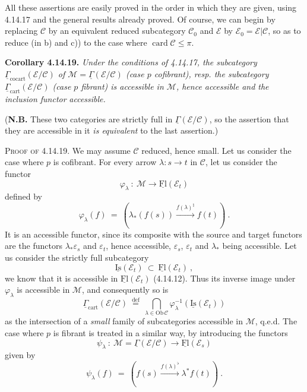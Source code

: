 \documentclass[11pt]{article}
\newcommand{\printedpage}[1]{\marginpar{\footnotesize p.~#1}}
\newcommand{\msp}[1]{\marginpar{\footnotesize [#1]}}
\newcommand{\uGamma}{\underline{\Gamma}}
\newcommand{\uFl}{\underline{\mathrm{Fl}}}
\newcommand{\uIs}{\underline{\mathrm{Is}}}
\newcommand{\Ob}{\mathrm{Ob}\,}
\newcommand{\Fl}{\mathrm{Fl}\,}
\newcommand{\cocart}{\mathrm{cocart}}
\newcommand{\cart}{\mathrm{cart}}
\begin{document}
\printedpage{149}

\msp{page 393}
All these assertions are easily proved in the order in which they are given, using 4.14.17 and the general results already proved. Of course, we can begin by replacing $\mathcal{C}$ by an equivalent reduced subcategory $\mathcal{C}_0$ and $\mathcal{E}$ by $\mathcal{E}_0 = \mathcal{E}|\mathcal{C}$, so as to reduce (in b) and c)) to the case where $\operatorname{card}\mathcal{C} \leqslant \pi$.

\textbf{Corollary 4.14.19.} \textit{Under the conditions of 4.14.17, the subcategory $\uGamma_{\cocart}(\mathcal{E}/\mathcal{C})$ of $\mathcal{M} = \uGamma(\mathcal{E}/\mathcal{C})$ (case $p$ cofibrant), resp. the subcategory $\uGamma_{\cart}(\mathcal{E}/\mathcal{C})$ (case $p$ fibrant) is accessible in $\mathcal{M}$, hence accessible and the inclusion functor} \textit{accessible.}

(\textbf{N.B.} These two categories are strictly full in $\uGamma(\mathcal{E}/\mathcal{C})$, so the assertion that they are accessible in it \textit{is equivalent} to the last assertion.)

\textsc{Proof of} 4.14.19. We may assume $\mathcal{C}$ reduced, hence small. Let us consider the case where $p$ is cofibrant. For every arrow $\lambda : s \longrightarrow t$ in $\mathcal{C}$, let us consider the functor
\[
\varphi_\lambda \ : \ \mathcal{M} \longrightarrow \uFl(\mathcal{E}_t)
\]
defined by
\msp{page 394}
\[
\varphi_\lambda(f) \ = \ (\lambda_*(f(s)) \xrightarrow{f(\lambda)^\natural} f(t)) \ .
\]
It is an accessible functor, since its composite with the source and target functors are the functors $\lambda_*\varepsilon_s$ and $\varepsilon_t$, hence accessible, $\varepsilon_s$, $\varepsilon_t$ and $\lambda_*$ being accessible. Let us consider the strictly full subcategory
\[
\uIs(\mathcal{E}_t) \ \subset \ \uFl(\mathcal{E}_t) \ ,
\]
we know that it is accessible in $\uFl(\mathcal{E}_t)$ (4.14.12). Thus its inverse image under $\varphi_\lambda$ is accessible in $\mathcal{M}$, and consequently so is
\[
\uGamma_{\cart}(\mathcal{E}/\mathcal{C}) \ \overset{\text{def}}{=} \ \bigcap_{\lambda\in\Ob\mathcal{C}} \varphi_\lambda^{-1}(\uIs(\mathcal{E}_t))
\]
as the intersection of a \textit{small} family of subcategories accessible in $\mathcal{M}$, q.e.d. The case where $p$ is fibrant is treated in a similar way, by introducing the functors
\[
\psi_\lambda \ : \ \mathcal{M} = \uGamma(\mathcal{E}/\mathcal{C}) \longrightarrow \uFl(\mathcal{E}_s)
\]
given by
\[
\psi_\lambda(f) \ = \ (f(s) \xrightarrow{f(\lambda)^\flat} \lambda^* f(t)) \ .
\]
\end{document}
